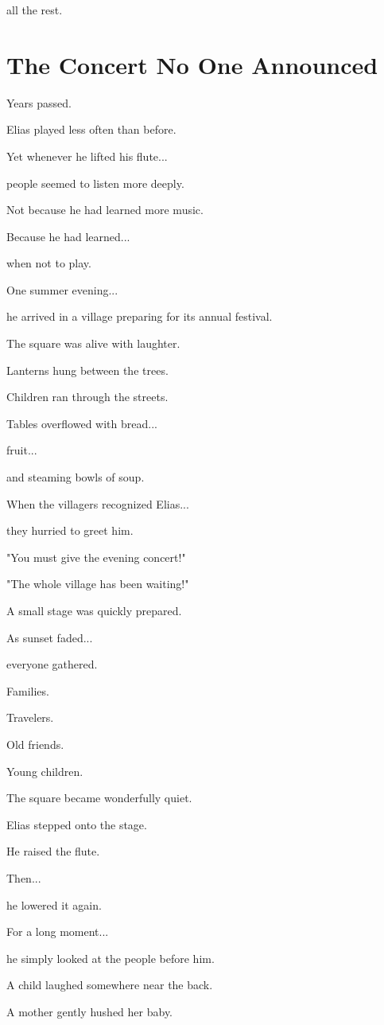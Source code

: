 \documentclass[12pt,openany]{book}
\begin{document}
all the rest.
\section*{The Concert No One Announced}

Years passed.

Elias played less often than before.

Yet whenever he lifted his flute...

people seemed to listen more deeply.

Not because he had learned more music.

Because he had learned...

when not to play.

One summer evening...

he arrived in a village preparing for its annual festival.

The square was alive with laughter.

Lanterns hung between the trees.

Children ran through the streets.

Tables overflowed with bread...

fruit...

and steaming bowls of soup.

When the villagers recognized Elias...

they hurried to greet him.

"You must give the evening concert!"

"The whole village has been waiting!"

A small stage was quickly prepared.

As sunset faded...

everyone gathered.

Families.

Travelers.

Old friends.

Young children.

The square became wonderfully quiet.

Elias stepped onto the stage.

He raised the flute.

Then...

he lowered it again.

For a long moment...

he simply looked at the people before him.

A child laughed somewhere near the back.

A mother gently hushed her baby.
\end{document}
